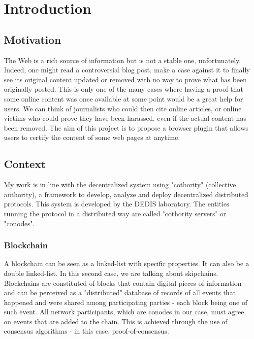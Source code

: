 \section{Introduction}

\subsection{Motivation}

The Web is a rich source of information but is not a stable one, unfortunately. Indeed, one might read a controversial blog post, make a case against it to finally see its original content updated or removed with no way to prove what has been originally posted. This is only one of the many cases where having a proof that some online content was once available at some point would be a great help for users. We can think of journalists who could then cite online articles, or online victims who could prove they have been harassed, even if the actual content has been removed. The aim of this project is to propose a browser plugin that allows users to certify the content of some web pages at anytime.

\subsection{Context}

My work is in line with the decentralized system using "cothority" (collective authority), a framework to develop, analyze and deploy decentralized distributed protocols. This system is developed by the DEDIS laboratory. The entities running the protocol in a distributed way are called "cothority servers" or "conodes".

\subsubsection{Blockchain}

A blockchain can be seen as a linked-list with specific properties. It can also be a double linked-list. In this second case, we are talking about skipchains. Blockchains are constituted of blocks that contain digital pieces of information and can be perceived as a "distributed" database of records of all events that happened and  were shared among participating parties - each block being one of such event.
All network participants, which are conodes in our case, must agree on events that are added to the chain. This is achieved through the use of consensus algorithms - in this case, proof-of-consensus.

